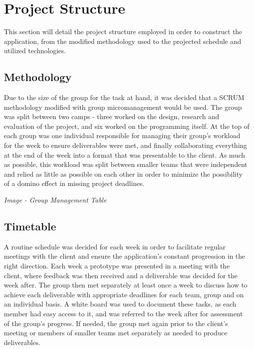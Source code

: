 \documentclass[a4paper,11pt]{article}
\begin{document}
\section{Project Structure}
This section will detail the project structure employed in order to construct the application, from the modified methodology used to the projected schedule and utilized technologies.

\subsection{Methodology}
Due to the size of the group for the task at hand, it was decided that a SCRUM methodology modified with group micromanagement would be used. The group was split between two camps - three worked on the design, research and evaluation of the project, and six worked on the programming itself. At the top of each group was one individual responsible for managing their group's workload for the week to ensure deliverables were met, and finally collaborating everything at the end of the week into a format that was presentable to the client. As much as possible, this workload was split between smaller teams that were independent and relied as little as possible on each other in order to minimize the possibility of a domino effect in missing project deadlines.

\begin{center}
\textit{Image - Group Management Table}
\end{center}

\subsection{Timetable}
A routine schedule was decided for each week in order to facilitate regular meetings with the client and ensure the application's constant progression in the right direction. Each week a prototype was presented in a meeting with the client, where feedback was then received and a deliverable was decided for the week after. The group then met separately at least once a week to discuss how to achieve each deliverable with appropriate deadlines for each team, group and on an individual basis. A white board was used to document these tasks, as each member had easy access to it, and was referred to the week after for assessment of the group's progress. If needed, the group met again prior to the client's meeting or members of smaller teams met separately as needed to produce deliverables.
\end{document}
